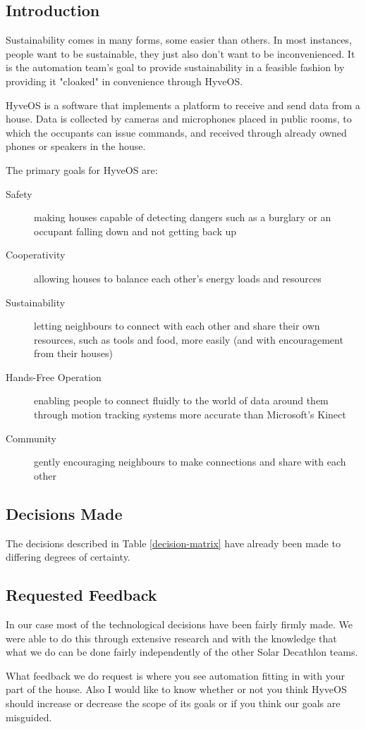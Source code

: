 \begin{multicols}{2}

\section{Introduction}

	Sustainability comes in many forms, some easier than others.
	In most instances, people want to be sustainable, they just also don't want to be inconvenienced.
	It is the automation team's goal to provide sustainability in a feasible fashion by providing it "cloaked" in convenience through HyveOS.
	
	HyveOS is a software that implements a platform to receive and send data from a house. 
	Data is collected by cameras and microphones placed in public rooms, to which the occupants can issue commands, and received through already owned phones or speakers in the house.
	
	The primary goals for HyveOS are:
	\begin{description}
		\item[Safety] making houses capable of detecting dangers such as a burglary or an occupant falling down and not getting back up
		\item[Cooperativity] allowing houses to balance each other's energy loads and resources
		\item[Sustainability] letting neighbours to connect with each other and share their own resources, such as tools and food, more easily (and with encouragement from their houses)
		\item[Hands-Free Operation] enabling people to connect fluidly to the world of data around them through motion tracking systems more accurate than Microsoft's Kinect
		\item[Community] gently encouraging neighbours to make connections and share with each other
	\end{description}

	\subsection{Decisions Made}
	
		The decisions described in Table \ref{decision-matrix} have already been made to differing degrees of certainty.
		
	\subsection{Requested Feedback}
	
		In our case most of the technological decisions have been fairly firmly made.
		We were able to do this through extensive research and with the knowledge that what we do can be done fairly independently of the other Solar Decathlon teams.
		
		What feedback we do request is where you see automation fitting in with your part of the house.
		Also I would like to know whether or not you think HyveOS should increase or decrease the scope of its goals or if you think our goals are misguided.


\end{multicols}
